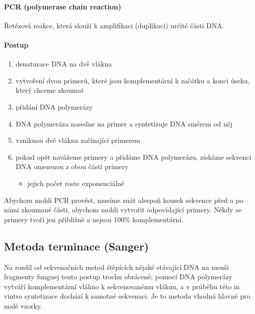 \documentclass[DIV=8]{scrreprt}
\newcommand{\mybox}[2]{
    \paragraph{#1} #2
}
\begin{document}
\mybox{PCR (polymerase chain reaction)}{Řetězová reakce, která slouží k amplifikaci (duplikaci) určité části DNA.

\paragraph{Postup}
\begin{enumerate}[nosep]
    \item denaturace DNA na dvě vlákna
    \item vytvoření dvou primerů, které jsou komplementární k začátku a konci úseku, který chceme zkoumat
    \item přidání DNA polymerázy
    \item DNA polymeráza nasedne na primer a syntetizuje DNA směrem od něj
    \item vzniknou dvě vlákna začínající primerem
    \item pokud opět navážeme primery a přidáme DNA polymerázu, získáme sekvenci DNA omezenou z obou částí primery
\begin{itemize}[nosep]
    \item jejich počet roste exponenciálně
\end{itemize}

\end{enumerate}



Abychom mohli PCR provést, musíme znát alespoň kousek sekvence před a po námi zkoumané části, abychom mohli vytvořit odpovídající primery. Někdy se primery tvoří jen přibližně a nejsou 100\% komplementární.}


\subsection{Metoda terminace (Sanger)} \label{Metoda terminace (Sanger)}


Na rozdíl od sekvenačních metod štěpících nějaké stávající DNA na menší fragmenty funguej tento postup trochu obráceně; pomocí DNA polymerázy vytváří komplementární vlákno k sekvenovanému vláknu, a v průběhu této in vintro syntetizace dochází k samotné sekvenaci. Je to metoda vhodná hlavně pro malé vzorky.
\end{document}
